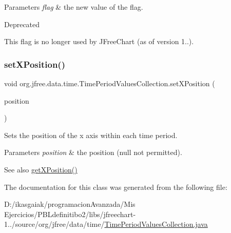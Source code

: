 \begin{DoxyParams}{Parameters}
{\em flag} & the new value of the flag.\\
\hline
\end{DoxyParams}
\begin{DoxyRefDesc}{Deprecated}
\item[\mbox{\hyperlink{deprecated__deprecated000278}{Deprecated}}]This flag is no longer used by J\+Free\+Chart (as of version 1..). \end{DoxyRefDesc}
\mbox{\label{classorg_1_1jfree_1_1data_1_1time_1_1_time_period_values_collection_aa959881c9c70b7a2da63870fd8ebdfe4}} 
\subsubsection{\texorpdfstring{set\+X\+Position()}{setXPosition()}}
{\footnotesize\ttfamily void org.\+jfree.\+data.\+time.\+Time\+Period\+Values\+Collection.\+set\+X\+Position (\begin{DoxyParamCaption}\item[{\mbox{\hyperlink{classorg_1_1jfree_1_1data_1_1time_1_1_time_period_anchor}{Time\+Period\+Anchor}}}]{position }\end{DoxyParamCaption})}

Sets the position of the x axis within each time period.


\begin{DoxyParams}{Parameters}
{\em position} & the position ({\ttfamily null} not permitted).\\
\hline
\end{DoxyParams}
\begin{DoxySeeAlso}{See also}
\mbox{\hyperlink{classorg_1_1jfree_1_1data_1_1time_1_1_time_period_values_collection_ae373cb525647af8dade90e59920acb78}{get\+X\+Position()}} 
\end{DoxySeeAlso}


The documentation for this class was generated from the following file\+:\begin{DoxyCompactItemize}
\item 
D\+:/ikasgaiak/programacion\+Avanzada/\+Mis Ejercicios/\+P\+B\+Ldefinitibo2/libs/jfreechart-\/1../source/org/jfree/data/time/\mbox{\hyperlink{_time_period_values_collection_8java}{Time\+Period\+Values\+Collection.\+java}}\end{DoxyCompactItemize}
